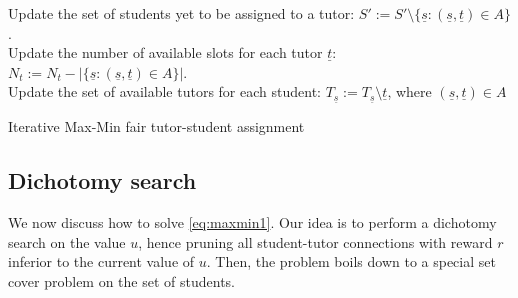 \documentclass[11pt,oneside,a4paper]{article}     %
\begin{document}
\begin{algorithm}[H]
{{{Update the set of students yet to be assigned to a tutor: $S':=S'\setminus \{\underline{s}:(\underline{s},\underline{t})\in A\}$.\\
Update the number of available slots for each tutor $\underline{t}$: $N_t:=N_t-|\{\underline{s}:(\underline{s},\underline{t})\in A\}|$.\\
Update the set of available tutors for each student: $T_{\underline{s}}:=T_{\underline{s}}\setminus \underline{t}$, where $(\underline{s},\underline{t})\in A$}
}}
\caption{Iterative Max-Min fair tutor-student assignment}
\label{alg:maxmin}
\end{algorithm}



\subsection{Dichotomy search}

We now discuss how to solve \ref{eq:maxmin1}. Our idea is to perform a dichotomy search on the value $u$, hence pruning all student-tutor connections with reward $r$ inferior to the current value of $u$. Then, the problem boils down to a special set cover problem on the set of students.\\
\end{document}
